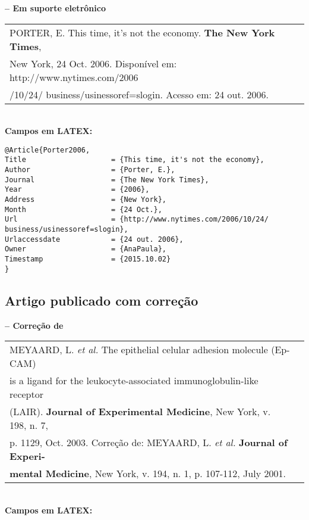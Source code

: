 \textbf{-- Em suporte eletrônico} \\

\begin{tabular}{|l|c|} \hline
	PORTER, E. This time, it's not the economy. \textbf{The New York Times}, \\New 
	York, 24 Oct. 2006. Disponível em: http://www.nytimes.com/2006\\/10/24/
	business/usinessoref=slogin. Acesso em: 24 out. 2006. \\\hline
\end{tabular} \\

\textbf{Campos em LATEX:} 

\begin{verbatim}
@Article{Porter2006,
Title                    = {This time, it's not the economy},
Author                   = {Porter, E.},
Journal                  = {The New York Times},
Year                     = {2006},
Address                  = {New York},
Month                    = {24 Oct.},
Url                      = {http://www.nytimes.com/2006/10/24/
business/usinessoref=slogin},
Urlaccessdate            = {24 out. 2006},
Owner                    = {AnaPaula},
Timestamp                = {2015.10.02}
}
\end{verbatim}

\subsection{Artigo publicado com correção}

\textbf{-- Correção de} \\

\begin{tabular}{|l|c|} \hline
	MEYAARD, L. \textit{et al.} The epithelial celular adhesion molecule (Ep-CAM)\\
	is a ligand for the leukocyte-associated immunoglobulin-like receptor
	\\(LAIR). \textbf{Journal of Experimental Medicine}, New York, v. 198, n. 7,\\ 
	p.	1129, Oct. 2003. Correção de: MEYAARD, L. \textit{et al.} \textbf{Journal of Experi-}\\ \textbf{mental Medicine}, New York, v. 194, n. 1, p. 107-112, July 2001.\\\hline
\end{tabular} \\

\textbf{Campos em LATEX:} 


